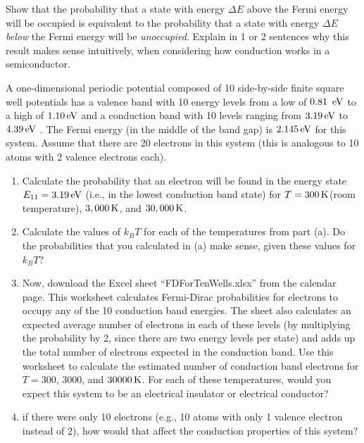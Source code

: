 
\begin{problem}
Show that the probability that a state with energy $\Delta E$ above the
Fermi energy will be occupied is equivalent to the probability that a state
with energy $\Delta E$ {\it below} the Fermi energy will be
{\it unoccupied}. Explain in 1 or 2 sentences why this result makes
sense intuitively, when considering how conduction works in a semiconductor.
\end{problem}

\newpage


\begin{problem}
A one-dimensional periodic potential composed of 10 side-by-side
finite square well potentials has a valence band with 10 energy
levels from a low of $0.81\,\mbox{ eV}$ to a high of $1.10\,\mbox{eV}$ 
and a conduction band with 10 levels ranging from $3.19\,\mbox{eV}$ to 
$4.39\,\mbox{eV}$ .
The Fermi energy (in the middle of the band
gap) is $2.145\,\mbox{eV}$ for this system. Assume that there are 20 electrons
in this system (this is analogous to 10 atoms with 2 valence electrons
each).
\begin{enumerate}
\item Calculate the probability that an electron will be found in the 
energy state $E_{11} = 3.19\,\mbox{eV}$ (i.e., in the lowest conduction
band state) for $T = 300\,\mbox{K} $(room temperature), $3,000\,\mbox{K}$, and
$30,000\,\mbox{K}$.
\item Calculate the values of $k_BT$ for each of the temperatures
from part (a). Do the probabilities that you calculated in (a) make
sense, given these values for $k_BT$?
\item Now, download the Excel sheet ``FDForTenWells.xlsx'' from
the calendar page.  This worksheet calculates Fermi-Dirac probabilities
for electrons to occupy any of the 10 conduction band energies.
The sheet also calculates an expected average number of electrons
in each of these levels (by multiplying the probability by 2, since
there are two energy levels per state) and adds up the total number of
electrons expected in the conduction band. Use this worksheet to
calculate the estimated number of conduction band electrons for
$T = 300$, 3000, and $30000\,\mbox{K}$. For each of these temperatures,
would you expect this system to be an electrical insulator or
electrical conductor?
\item if there were only 10 electrons (e.g., 10 atoms with only
1 valence electron instead of 2), how would that affect the
conduction properties of this system?
\end{enumerate}
\end{problem}

